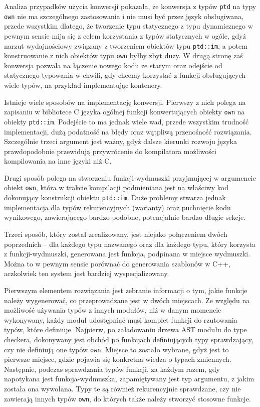 \documentclass[licencjacka]{pracamgr}
\begin{document}
Analiza przypadków użycia konwersji pokazała, że konwersja z typów \texttt{ptd} na typy \texttt{own} nie ma 
szczególnego zastosowania i nie musi być przez język obsługiwana, przede wszystkim dlatego,
że tworzenie typu statycznego z typu dynamicznego w pewnym sensie mija się z celem korzystania z typów statycznych w ogóle,
gdyż narzut wydajnościowy związany z tworzeniem obiektów typu \texttt{ptd::im}, a potem konstruowanie z nich obiektów typu \texttt{own} byłby zbyt duży.
W drugą stronę zaś konwersja pozwala na łączenie nowego kodu ze starym oraz odejście od statycznego typowania w chwili,
gdy chcemy korzystać z funkcji obsługujących wiele typów, na przykład implementując kontenery.

Istnieje wiele sposobów na implementację konwersji. Pierwszy z nich polega na zapisaniu w bibliotece C języka ogólnej funkcji konwertujących obiekty \texttt{own} na obiekty \texttt{ptd::im}.
Podejście to ma jednak wiele wad, przede wszystkim trudność implementacji, dużą podatność na błędy oraz wątpliwą przenośność rozwiązania.
Szczególnie trzeci argument jest ważny, gdyż dalsze kierunki rozwoju języka prawdopodobnie przewidują przywrócenie do kompilatora możliwości kompilowania na inne języki niż C.

Drugi sposób polega na stworzeniu funkcji-wydmuszki przyjmującej w argumencie obiekt \texttt{own}, która w trakcie kompilacji podmieniana jest na właściwy kod dokonujący konstrukcji obiektu \texttt{ptd::im}.
Duże problemy stwarza jednak implementacja dla typów rekurencyjnych (warianty) oraz puchnięcie kodu wynikowego, zawierającego bardzo podobne, potencjalnie bardzo długie sekcje.

Trzeci sposób, który został zrealizowany, jest niejako połączeniem dwóch poprzednich -- dla każdego typu
nazwanego oraz dla każdego typu, który korzysta z funkcji-wydmuszki, generowana jest funkcja,
podpinana w miejsce wydmuszki. Można to w pewnym sensie porównać do generowania szablonów w C++, aczkolwiek ten system jest bardziej wyspecjalizowany.

Pierwszym elementem rozwiązania jest zebranie informacji o tym, jakie funkcje należy wygenerować,
co przeprowadzane jest w dwóch miejscach.
Ze względu na możliwość używania typów z innych modułów, niż w danym momencie wykonywany, każdy moduł udostępniać musi komplet funkcji do rzutowania typów, które definiuje.
Najpierw, po załadowaniu drzewa AST modułu do type checkera, dokonywany jest obchód po funkcjach definiujących typy sprawdzający, czy nie definiują one typów \texttt{own}.
Miejsce to zostało wybrane, gdyż jest to pierwsze miejsce, gdzie pojawia się konkretna wiedza o typach zmiennych.
Następnie, podczas sprawdzania typów funkcji, za każdym razem, gdy napotykana jest funkcja-wydmuszka, zapamiętywany jest typ argumentu, z jakim została ona wywołana.
Typy te są również rekurencyjnie sprawdzane, czy nie zawierają innych typów \texttt{own}, do których także należy stworzyć stosowne funkcje.
\end{document}
